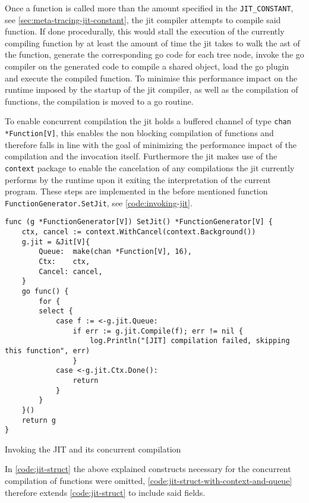 Once a function is called more than the amount specified in the
\texttt{JIT\_CONSTANT}, see \autoref{sec:meta-tracing-jit-constant}, the jit
compiler attempts to compile said function. If done procedurally, this would
stall the execution of the currently compiling function by at least the amount
of time the jit takes to walk the ast of the function, generate the
corresponding go code for each tree node, invoke the go compiler on the
generated code to compile a shared object, load the go plugin and execute the
compiled function. To minimise this performance impact on the runtime imposed
by the startup of the jit compiler, as well as the compilation of functions,
the compilation is moved to a go routine.

To enable concurrent compilation the jit holds a buffered channel of type
\texttt{chan *Function[V]}, this enables the non blocking compilation
of functions and therefore falls in line with the goal of minimizing the
performance impact of the compilation and the invocation itself. Furthermore
the jit makes use of the \texttt{context} package to enable the cancelation of
any compilations the jit currently performs by the runtime upon it exiting the
interpretation of the current program. These steps are implemented in the
before mentioned function \texttt{FunctionGenerator.SetJit}, see
\autoref{code:invoking-jit}. 

\begin{listing}[H]
    \begin{verbatim}
func (g *FunctionGenerator[V]) SetJit() *FunctionGenerator[V] {
    ctx, cancel := context.WithCancel(context.Background())
    g.jit = &Jit[V]{
        Queue:  make(chan *Function[V], 16),
        Ctx:    ctx,
        Cancel: cancel,
    }
    go func() {
        for {
        select {
            case f := <-g.jit.Queue:
                if err := g.jit.Compile(f); err != nil {
                    log.Println("[JIT] compilation failed, skipping this function", err)
                }
            case <-g.jit.Ctx.Done():
                return
            }
        }
    }()
    return g
}
    \end{verbatim}
    \caption{Invoking the JIT and its concurrent compilation}
    \label{code:invoking-jit}
\end{listing}

In \autoref{code:jit-struct} the above explained constructs necessary for the
concurrent compilation of functions were omitted,
\autoref{code:jit-struct-with-context-and-queue} therefore extends
\autoref{code:jit-struct} to include said fields.

